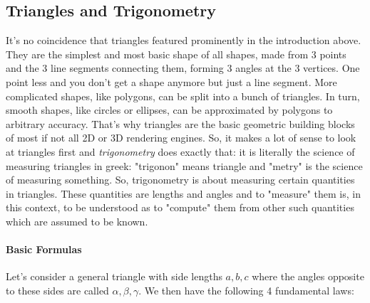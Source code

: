 \subsection{Triangles and Trigonometry}
It's no coincidence that triangles featured prominently in the introduction above. They are the simplest and most basic shape of all shapes, made from 3 points and the 3 line segments connecting them, forming 3 angles at the 3 vertices. One point less and you don't get a shape anymore but just a line segment. More complicated shapes, like polygons, can be split into a bunch of triangles. In turn, smooth shapes, like circles or ellipses, can be approximated by polygons to arbitrary accuracy. That's why triangles are the basic geometric building blocks of most if not all 2D or 3D rendering engines. So, it makes a lot of sense to look at triangles first and \emph{trigonometry} does exactly that: it is literally the science of measuring triangles in greek: "trigonon" means triangle and "metry" is the science of measuring something. So, trigonometry is about measuring certain quantities in triangles. These quantities are lengths and angles and to "measure" them is, in this context, to be understood as to "compute" them from other such quantities which are assumed to be known.




\paragraph{Basic Formulas}

Let's consider a general triangle with side lengths $a,b,c$ where the angles opposite to these sides are called $\alpha, \beta, \gamma$. We then have the following 4 fundamental laws:

